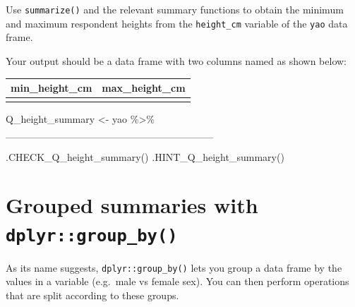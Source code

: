 \documentclass[
  letterpaper,
  DIV=11,
  numbers=noendperiod]{scrreprt}
\newenvironment{Shaded}{\begin{snugshade}}{\end{snugshade}}
\newcommand{\FunctionTok}[1]{\textcolor[rgb]{0.28,0.35,0.67}{#1}}
\newcommand{\NormalTok}[1]{\textcolor[rgb]{0.00,0.23,0.31}{#1}}
\newcommand{\OtherTok}[1]{\textcolor[rgb]{0.00,0.23,0.31}{#1}}
\newcommand{\SpecialCharTok}[1]{\textcolor[rgb]{0.37,0.37,0.37}{#1}}
\begin{document}
\begin{tcolorbox}[enhanced jigsaw, title=\textcolor{quarto-callout-tip-color}{\faLightbulb}\hspace{0.5em}{Practice}, colbacktitle=quarto-callout-tip-color!10!white, leftrule=.75mm, arc=.35mm, opacityback=0, bottomrule=.15mm, rightrule=.15mm, toptitle=1mm, breakable, toprule=.15mm, colback=white, coltitle=black, colframe=quarto-callout-tip-color-frame, bottomtitle=1mm, titlerule=0mm, left=2mm, opacitybacktitle=0.6]

Use \texttt{summarize()} and the relevant summary functions to obtain
the minimum and maximum respondent heights from the \texttt{height\_cm}
variable of the \texttt{yao} data frame.

Your output should be a data frame with two columns named as shown
below:

\begin{longtable}[]{@{}ll@{}}
\toprule\noalign{}
min\_height\_cm & max\_height\_cm \\
\midrule\noalign{}
\endhead
\bottomrule\noalign{}
\endlastfoot
& \\
\end{longtable}

\begin{Shaded}
\begin{Highlighting}[]
\NormalTok{Q\_height\_summary }\OtherTok{\textless{}{-}} 
\NormalTok{  yao }\SpecialCharTok{\%\textgreater{}\%} 
\NormalTok{  \_\_\_\_\_\_\_\_\_\_\_\_\_\_\_\_\_\_\_\_\_\_\_\_\_\_\_\_}
\end{Highlighting}
\end{Shaded}

\begin{Shaded}
\begin{Highlighting}[]
\FunctionTok{.CHECK\_Q\_height\_summary}\NormalTok{()}
\FunctionTok{.HINT\_Q\_height\_summary}\NormalTok{()}
\end{Highlighting}
\end{Shaded}

\end{tcolorbox}

\section{\texorpdfstring{Grouped summaries with
\texttt{dplyr::group\_by()}}{Grouped summaries with dplyr::group\_by()}}\label{grouped-summaries-with-dplyrgroup_by}

As its name suggests, \texttt{dplyr::group\_by()} lets you group a data
frame by the values in a variable (e.g.~male vs female sex). You can
then perform operations that are split according to these groups.
\end{document}
